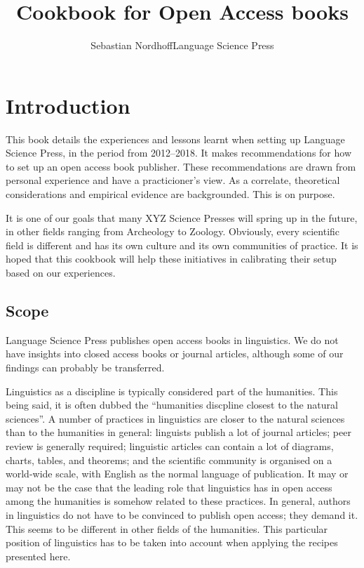 \documentclass[guidelines,nonflat,modfonts] {langsci/langscibook}
\title{Cookbook for Open Access books}
\author{Sebastian Nordhoff\newlineCover Language Science Press}
\begin{document}
\maketitle
\frontmatter 
\tableofcontents 
\mainmatter
\chapter{Introduction}
This book details the experiences and lessons learnt when setting up Language Science Press, in the period from 2012--2018. It makes recommendations for how to set up an open access book publisher. These recommendations are drawn from personal experience and have a practicioner's view. As a correlate, theoretical considerations and empirical evidence are backgrounded. This is on purpose. 

It is one of our goals that many XYZ Science Presses will spring up in the future, in other fields ranging from Archeology to Zoology. Obviously, every scientific field is different and has its own culture and its own communities of practice. It is hoped that this cookbook will help these initiatives in calibrating their setup based on our experiences. 

\section{Scope}
Language Science Press publishes open access books in linguistics. We do not have insights into closed access books or journal articles, although some of our findings can probably be transferred. 

Linguistics as a discipline is typically considered part of the humanities. This being said, it is often dubbed the ``humanities discpline closest to the natural sciences''. A number of practices in linguistics are closer to the natural sciences than to the humanities in general: linguists publish a lot of journal articles; peer review is generally required; linguistic articles can contain a lot of diagrams, charts, tables, and theorems; and the scientific community is organised on a world-wide scale, with English as the normal language of publication. It may or may not be the case that the leading role that linguistics has in open access among the humanities is somehow related to these practices. In general, authors in linguistics do not have to be convinced to publish open access; they demand it. This seems to be different in other fields of the humanities. This particular position of linguistics has to be taken into account when applying the recipes presented here. 
\end{document}
